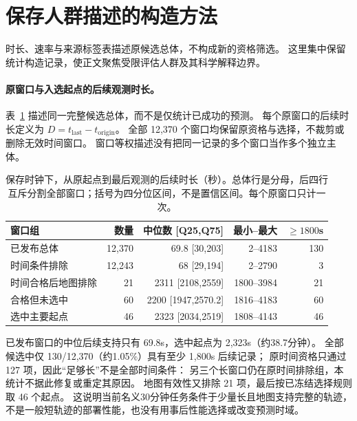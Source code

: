 \section{保存人群描述的构造方法}
\label{sec:population-description-construction}\hypertarget{sec:population-description-construction}{}
时长、速率与来源标签表描述原候选总体，不构成新的资格筛选。
这里集中保留统计构造记录，使正文聚焦受限评估人群及其科学解释边界。

\paragraph{原窗口与入选起点的后续观测时长。}\label{sec:final-cohort-durations}\hypertarget{sec:final-cohort-durations}{}
表~\ref{tab:final-cohort-durations} 描述同一完整候选总体，而不是仅统计已成功的预测。
每个原窗口的后续时长定义为 $D=t_{\mathrm{last}}-t_{\mathrm{origin}}$。
全部 12,370 个窗口均保留原资格与选择，不裁剪或删除无效时间窗口。
窗口等权描述没有把同一记录的多个窗口当作多个独立主体。

\begin{table}[htbp]
\centering\small
\caption{保存时钟下，从原起点到最后观测的后续时长（秒）。总体行是分母，后四行互斥分割全部窗口；括号为四分位区间，不是置信区间。每个原窗口只计一次。}
\label{tab:final-cohort-durations}\hypertarget{tab:final-cohort-durations}{}
\begin{tabular}{@{}lrrrr@{}}
\toprule
窗口组 & 数量 & 中位数 [Q25,Q75] & 最小--最大 & $\geq1800$s\\
\midrule
已发布总体 & 12,370 & 69.8 [30,203] & 2--4183 & 130\\
时间条件排除 & 12,243 & 68 [29,194] & 2--2790 & 3\\
时间合格后地图排除 & 21 & 2311 [2108,2559] & 1800--3984 & 21\\
合格但未选中 & 60 & 2200 [1947,2570.2] & 1816--4183 & 60\\
选中主要起点 & 46 & 2323 [2034,2519] & 1808--4143 & 46\\
\bottomrule
\end{tabular}
\end{table}

已发布窗口的中位后续支持只有 69.8s，选中起点为 2,323s（约38.7分钟）。
全部候选中仅 130/12,370（约1.05\%）具有至少 1,800s 后续记录；
原时间资格只通过 127 项，因此“足够长”不是全部时间条件：
另三个长窗口仍在原时间排除组，本统计不据此修复或重定其原因。
地图有效性又排除 21 项，最后按已冻结选择规则取 46 个起点。
这说明当前名义30分钟任务条件于少量长且地图支持完整的轨迹，
不是一般短轨迹的部署性能，也没有用事后性能选择或改变预测时域。

